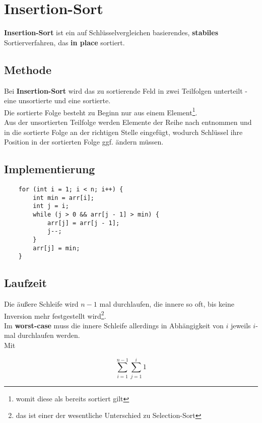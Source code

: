 \section{Insertion-Sort}

\textbf{Insertion-Sort} ist ein auf Schlüsselvergleichen basierendes, \textbf{stabiles} Sortierverfahren, das \textbf{in place} sortiert.

\subsection{Methode}

Bei \textbf{Insertion-Sort} wird das zu sortierende Feld in zwei Teilfolgen unterteilt - eine unsortierte und eine sortierte.\\
Die sortierte Folge besteht zu Beginn nur aus einem Element\footnote{womit diese als bereits sortiert gilt}.\\
Aus der unsortierten Teilfolge werden Elemente der Reihe nach entnommen und in die sortierte Folge an der richtigen Stelle eingefügt, wodurch Schlüssel ihre Position in der sortierten Folge ggf. ändern müssen.

\subsection{Implementierung}

\begin{verbatim}
    for (int i = 1; i < n; i++) {
        int min = arr[i];
        int j = i;
        while (j > 0 && arr[j - 1] > min) {
            arr[j] = arr[j - 1];
            j--;
        }
        arr[j] = min;
    }
\end{verbatim}

\subsection{Laufzeit}
Die äußere Schleife wird $n-1$ mal durchlaufen, die innere so oft, bis keine Inversion mehr festgestellt wird\footnote{
    das ist einer der wesentliche Unterschied zu Selection-Sort
}.\\
Im \textbf{worst-case} muss die innere Schleife allerdings in Abhängigkeit von $i$ jeweils $i$-mal durchlaufen werden.\\

Mit

\begin{equation}
    \sum_{i = 1}^{n-1} \sum_{j=1}^i 1
\end{equation}

